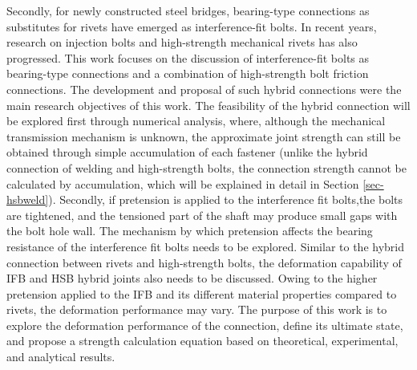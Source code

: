 Secondly, for newly constructed steel bridges, bearing-type connections as substitutes for rivets have emerged as interference-fit bolts. In recent years, research on injection bolts and high-strength mechanical rivets has also progressed. This work focuses on the discussion of interference-fit bolts as bearing-type connections and a combination of high-strength bolt friction connections. The development and proposal of such hybrid connections were the main research objectives of this work. The feasibility of the hybrid connection will be explored first through numerical analysis, where, although the mechanical transmission mechanism is unknown, the approximate joint strength can still be obtained through simple accumulation of each fastener (unlike the hybrid connection of welding and high-strength bolts, the connection strength cannot be calculated by accumulation, which will be explained in detail in Section \ref{sec-hsbweld}). Secondly, if pretension is applied to the interference fit bolts,the bolts are tightened, and the tensioned part of the shaft may produce small gaps with the bolt hole wall. The mechanism by which pretension affects the bearing resistance of the interference fit bolts needs to be explored. Similar to the hybrid connection between rivets and high-strength bolts, the deformation capability of IFB and HSB hybrid joints also needs to be discussed. Owing to the higher pretension applied to the IFB and its different material properties compared to rivets, the deformation performance may vary. The purpose of this work is to explore the deformation performance of the connection, define its ultimate state, and propose a strength calculation equation based on theoretical, experimental, and analytical results.


